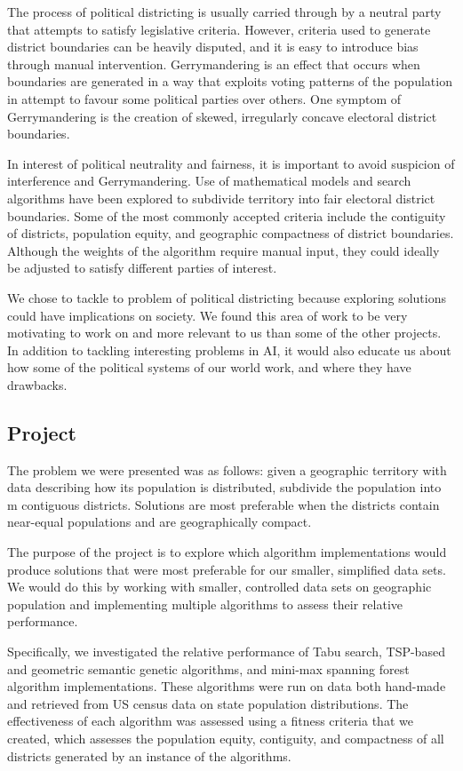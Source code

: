 \documentclass[journal]{IEEEtran}
\begin{document}
The process of political districting is usually carried through by a neutral
party that attempts to satisfy legislative criteria\cite{legislature}. However, criteria used
to generate district boundaries can be heavily disputed, and it is easy to
introduce bias through manual intervention. Gerrymandering is an effect that
occurs when boundaries are generated in a way that exploits voting patterns
of the population in attempt to favour some political parties over others\cite{gerry}.
One symptom of Gerrymandering is the creation of skewed, irregularly concave
electoral district boundaries.

In interest of political neutrality and fairness, it is important to avoid
suspicion of interference and  Gerrymandering. Use of mathematical models
and search algorithms have been explored to subdivide territory into fair
electoral district boundaries. Some of the most commonly accepted criteria
include the contiguity of districts, population equity, and geographic
compactness of district boundaries. Although the weights of the algorithm
require manual input, they could ideally be adjusted to satisfy different
parties of interest.

We chose to tackle to problem of political districting because exploring
solutions could have implications on society. We found this area of work
to be very motivating to work on and more relevant to us than some of the
other projects. In addition to tackling interesting problems in AI, it would
also educate us about how some of the political systems of our world work,
and where they have drawbacks.


\subsection{Project}
The problem we were presented was as follows: given a geographic territory
with data describing how its population is distributed, subdivide the
population into m contiguous districts. Solutions are most preferable
when the districts contain near-equal populations and are geographically compact.

The purpose of the project is to explore which algorithm implementations
would produce solutions that were most preferable for our smaller, simplified
data sets. We would do this by working with smaller, controlled data sets on
geographic population and implementing multiple algorithms to assess their
relative performance.

Specifically, we investigated the relative performance of Tabu search,
TSP-based and geometric semantic genetic algorithms, and mini-max spanning
forest algorithm implementations. These algorithms were run on data both
hand-made and retrieved from US census data on state population distributions.
The effectiveness of each algorithm was assessed using a fitness criteria that
we created, which assesses the population equity, contiguity, and compactness
of all districts generated by an instance of the algorithms.
\end{document}
